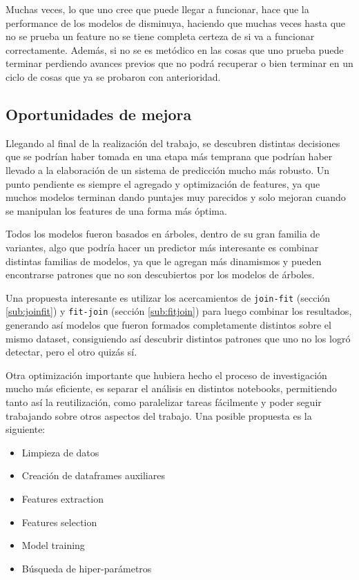 \documentclass[titlepage,a4paper]{article}
\begin{document}
Muchas veces, lo que uno cree que puede llegar a funcionar, hace que la performance de los modelos de disminuya, haciendo que muchas veces hasta que no se prueba un feature no se tiene completa certeza de si va a funcionar correctamente. Además, si no se es metódico en las cosas que uno prueba puede terminar perdiendo avances previos que no podrá recuperar o bien terminar en un ciclo de cosas que ya se probaron con anterioridad.

\subsection{Oportunidades de mejora}\label{sub:opp_mejoras}
Llegando al final de la realización del trabajo, se descubren distintas decisiones que se podrían haber tomada en una etapa más temprana que podrían haber llevado a la elaboración de un sistema de predicción mucho más robusto. Un punto pendiente es siempre el agregado y optimización de features, ya que muchos modelos terminan dando puntajes muy parecidos y solo mejoran cuando se manipulan los features de una forma más óptima.

Todos los modelos fueron basados en árboles, dentro de su gran familia de variantes, algo que podría hacer un predictor más interesante es combinar distintas familias de modelos, ya que le agregan más dinamismos y pueden encontrarse patrones que no son descubiertos por los modelos de árboles.

Una propuesta interesante es utilizar los acercamientos de \verb|join-fit| (sección \ref{sub:joinfit}) y \verb|fit-join| (sección \ref{sub:fitjoin}) para luego combinar los resultados, generando así modelos que fueron formados completamente distintos sobre el mismo dataset, consiguiendo así descubrir distintos patrones que uno no los logró detectar, pero el otro quizás sí.

Otra optimización importante que hubiera hecho el proceso de investigación mucho más eficiente, es separar el análisis en distintos notebooks, permitiendo tanto así la reutilización, como paralelizar tareas fácilmente y poder seguir trabajando sobre otros aspectos del trabajo. Una posible propuesta es la siguiente: 
\begin{itemize}
    \item Limpieza de datos
    \item Creación de dataframes auxiliares
    \item Features extraction
    \item Features selection
    \item Model training
    \item Búsqueda de hiper-parámetros
\end{itemize}
\end{document}
